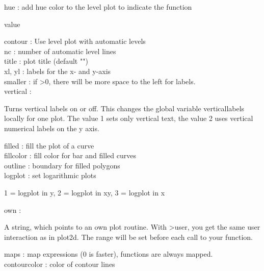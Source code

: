 \documentclass[a4paper,10pt]{article}
\begin{document}
\begin{eulernotebook}
\begin{eulercomment}
\begin{eulercomment}
\begin{eulercomment}
\begin{eulercomment}
\begin{eulercomment}
\begin{eulercomment}
\begin{eulercomment}
\begin{eulercomment}
\begin{eulercomment}
hue       : add hue color to the level plot to indicate the function\\
\end{eulercomment}
\begin{eulerttcomment}
            value
\end{eulerttcomment}
\begin{eulercomment}
contour   : Use level plot with automatic levels\\
nc        : number of automatic level lines\\
title     : plot title (default "")\\
xl, yl    : labels for the x- and y-axis\\
smaller   : if \textgreater{}0, there will be more space to the left for labels.\\
vertical  :\\
\end{eulercomment}
\begin{eulerttcomment}
  Turns vertical labels on or off. This changes the global variable
  verticallabels locally for one plot. The value 1 sets only vertical
  text, the value 2 uses vertical numerical labels on the y axis.
\end{eulerttcomment}
\begin{eulercomment}
filled    : fill the plot of a curve\\
fillcolor : fill color for bar and filled curves\\
outline   : boundary for filled polygons\\
logplot   : set logarithmic plots\\
\end{eulercomment}
\begin{eulerttcomment}
            1 = logplot in y,
            2 = logplot in xy,
            3 = logplot in x
\end{eulerttcomment}
\begin{eulercomment}
own       :\\
\end{eulercomment}
\begin{eulerttcomment}
  A string, which points to an own plot routine. With >user, you get
  the same user interaction as in plot2d. The range will be set
  before each call to your function.
\end{eulerttcomment}
\begin{eulercomment}
maps      : map expressions (0 is faster), functions are always
mapped.\\
contourcolor : color of contour lines\\

\end{eulercomment}
\end{eulercomment}
\end{eulercomment}
\end{eulercomment}
\end{eulercomment}
\end{eulercomment}
\end{eulercomment}
\end{eulercomment}
\end{eulercomment}
\end{eulernotebook}
\end{document}
